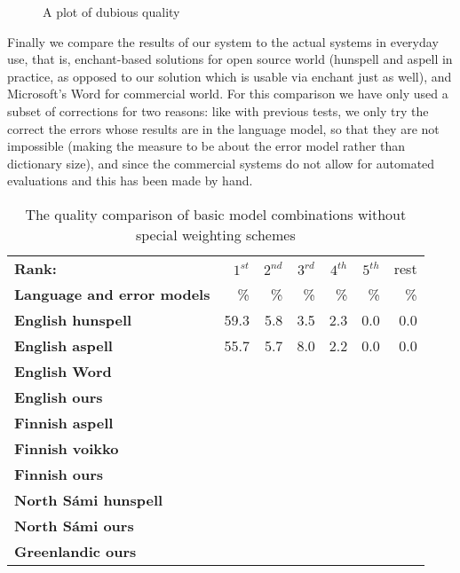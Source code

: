 \documentclass[a4paper,12pt]{article}
\begin{document}
\begin{figure}
    \centering
    \caption{A plot of dubious quality
    \label{fig:smoothing-quality}}
\end{figure}

Finally we compare the results of our system to the actual systems in everyday
use, that is, enchant-based solutions for open source world (hunspell and
aspell in practice, as opposed to our solution which is usable via enchant just
as well), and Microsoft's Word for commercial world. For this comparison we
have only used a subset of corrections for two reasons: like with previous
tests, we only try the correct the errors whose results are in the language
model, so that they are not impossible (making the measure to be about the
error model rather than dictionary size), and since the commercial systems do
not allow for automated evaluations and this has been made by hand. 

\begin{table}
    \centering
    \begin{tabular}{|l|r|r|r|r|r|r|}
        \hline
        \bf Rank: & $1^{st}$ & $2^{nd}$ & $3^{rd}$ & $4^{th}$ & $5^{th}$ & rest \\
        \bf Language and error models &  \% & \% & \% & \% & \% & \% \\
        \hline
        \bf English hunspell & 59.3 & 5.8 & 3.5 & 2.3 & 0.0 & 0.0 \\
          \bf English aspell & 55.7 & 5.7 & 8.0 & 2.2 & 0.0 & 0.0 \\
            \bf English Word & & & & & &  \\
            \bf English ours & & & & & & \\
        \hline
        \bf Finnish aspell & & & & & & \\
        \bf Finnish voikko & & & & & & \\
          \bf Finnish ours & & & & & & \\
        \hline
        \bf North Sámi hunspell & & & & & & \\
            \bf North Sámi ours & & & & & & \\
        \hline
        \bf Greenlandic ours & & & & & & \\
        \hline
    \end{tabular}
    \caption{The quality comparison of basic model combinations without special
    weighting schemes\label{table:commercial-quality}}
\end{table}
\end{document}
